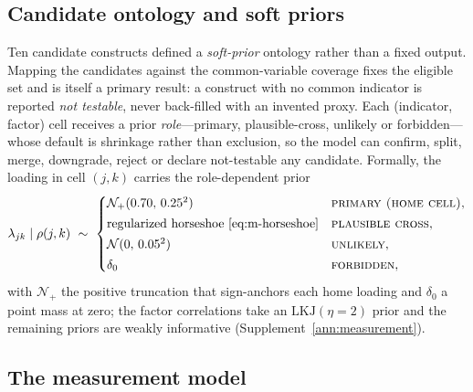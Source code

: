 \subsection{Candidate ontology and soft priors}

Ten candidate constructs defined a \emph{soft-prior} ontology rather than a fixed
output.
Mapping the candidates against the common-variable coverage fixes the eligible set and
is itself a primary result: a construct with no common indicator is reported
\emph{not testable}, never back-filled with an invented proxy. Each (indicator, factor)
cell receives a prior \emph{role}---primary, plausible-cross, unlikely or
forbidden---whose default is shrinkage rather than exclusion, so the model can confirm,
split, merge, downgrade, reject or declare not-testable any candidate. Formally, the
loading in cell $(j,k)$ carries the role-dependent prior
\begin{equation}
  \lambda_{jk}\mid\rho(j,k)\ \sim\
  \begin{cases}
    \mathcal{N}_{+}(0.70,\,0.25^2) & \textsc{primary (home cell)},\\[2pt]
    \text{regularized horseshoe }\eqref{eq:m-horseshoe} & \textsc{plausible cross},\\[2pt]
    \mathcal{N}(0,\,0.05^2)        & \textsc{unlikely},\\[2pt]
    \delta_{0}                     & \textsc{forbidden},
  \end{cases}
  \label{eq:m-softprior}
\end{equation}
with $\mathcal N_{+}$ the positive truncation that sign-anchors each home loading and
$\delta_0$ a point mass at zero; the factor correlations take an $\mathrm{LKJ}(\eta{=}2)$
prior and the remaining priors are weakly informative (Supplement~\ref{ann:measurement}).

\subsection{The measurement model}

